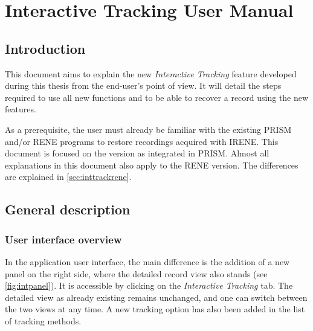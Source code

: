 
\cleardoublepage
\chapter{Interactive Tracking User Manual}
\label{chap:usermanint}

\section{Introduction}

This document aims to explain the new \emph{Interactive Tracking} feature developed during this thesis from the end-user's point of view. It will detail the steps required to use all new functions and to be able to recover a record using the new features.

As a prerequisite, the user must already be familiar with the existing PRISM and/or RENE programs to restore recordings acquired with IRENE. This document is focused on the version as integrated in PRISM. Almost all explanations in this document also apply to the RENE version. The differences are explained in \autoref{sec:inttrackrene}.

\section{General description}

\subsection{User interface overview}

In the application user interface, the main difference is the addition of a new panel on the right side, where the detailed record view also stands (see \autoref{fig:intpanel}). It is accessible by clicking on the \emph{Interactive Tracking} tab. The detailed view as already existing remains unchanged, and one can switch between the two views at any time. A new tracking option has also been added in the list of tracking methods.


